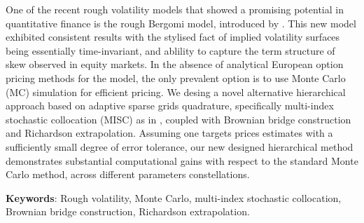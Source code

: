 One of the recent rough volatility models that showed a promising potential in quantitative finance   is the rough Bergomi model, introduced by \cite{bayer2016pricing}. This new model exhibited consistent results with the stylised fact of implied volatility surfaces being essentially time-invariant, and  ablility to capture the term structure of skew observed in equity markets. In the absence of analytical European option pricing methods for the model,  the only prevalent option is to use Monte Carlo (MC) simulation for efficient pricing. We desing a novel alternative hierarchical approach based on adaptive sparse grids quadrature, specifically  multi-index stochastic collocation (MISC) as in  \cite{haji2016multi}, coupled with Brownian bridge construction and Richardson extrapolation.  Assuming one targets prices estimates with a sufficiently small degree of error tolerance, our new designed hierarchical  method  demonstrates substantial computational gains with respect to the standard Monte Carlo method, across different parameters constellations.


\textbf{Keywords}: Rough volatility, Monte Carlo, multi-index stochastic collocation, Brownian bridge construction, Richardson extrapolation.
